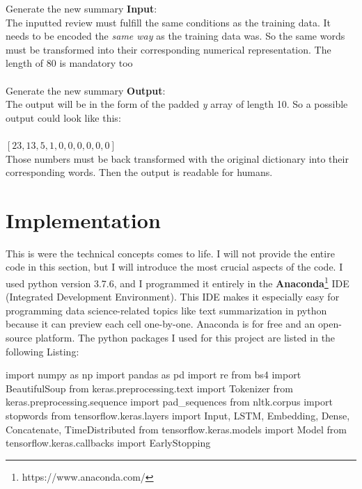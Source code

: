 \begin{tcolorbox}
	Generate the new summary \textbf{Input}: \\
	
	The inputted review must fulfill the same conditions as the training data. It needs to be encoded the \textit{same way} as the training data was. So the same words must be transformed into their corresponding numerical representation. The length of 80 is mandatory too \\\\
	
	
	Generate the new summary \textbf{Output}: \\
	
	The output will be in the form of the padded \textit{y} array of length 10. So a possible output could look like this: \\\\
	\([23, 13, 5, 1, 0, 0, 0, 0, 0, 0]\) \\
	
	Those numbers must be back transformed with the original dictionary into their corresponding words. Then the output is readable for humans.
\end{tcolorbox}

\newpage

\section{Implementation}\label{ss:imp}

This is were the technical concepts comes to life. I will not provide the entire code in this section, but I will introduce the most crucial aspects of the code. I used python version 3.7.6, and I programmed it entirely in the \textbf{Anaconda}\footnote{https://www.anaconda.com/} IDE (Integrated Development Environment). This IDE makes it especially easy for programming data science-related topics like text summarization in python because it can preview each cell one-by-one. Anaconda is for free and an open-source platform. The python packages I used for this project are listed in the following Listing:

\begin{python}
	import numpy as np  
	import pandas as pd 
	import re           
	from bs4 import BeautifulSoup 
	from keras.preprocessing.text import Tokenizer 
	from keras.preprocessing.sequence import pad_sequences
	from nltk.corpus import stopwords   
	from tensorflow.keras.layers import Input, LSTM, Embedding, Dense, Concatenate, TimeDistributed
	from tensorflow.keras.models import Model
	from tensorflow.keras.callbacks import EarlyStopping
\end{python}

